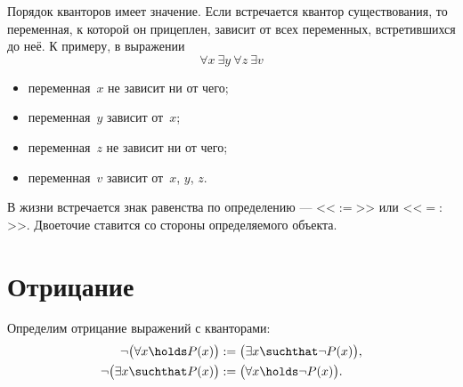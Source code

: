 \begin{note}
	Порядок кванторов имеет значение. Если встречается квантор существования, то
	переменная, к которой он прицеплен, зависит от всех переменных, встретившихся
	до неё. К примеру, в выражении
	\[
		\forall x\ 
		\exists y\ 
		\forall z\ 
		\exists v
	\]
	\begin{itemize}
		\item переменная~$x$ не зависит ни от чего;
		\item переменная~$y$ зависит от~$x$;
		\item переменная~$z$ не зависит ни от чего;
		\item переменная~$v$ зависит от~$x$, $y$, $z$.
	\end{itemize}
\end{note}

\begin{note}
	В жизни встречается знак равенства по определению --- <<$:=$>> или <<$=:$>>.
	Двоеточие ставится со стороны определяемого объекта.
\end{note}

\section{Отрицание}

\begin{definition}
	\label{def:neg_quantors_simple}
	Определим отрицание выражений с кванторами:
	\begin{align}
		\neg
		\bigl(
			\forall x
			\holds
			P(x)
		\bigr)
		&:=
		\bigl(
			\exists x
			\suchthat
			\neg
			P(x)
		\bigr)
		,
		\\
		\neg
		\bigl(
			\exists x
			\suchthat
			P(x)
		\bigr)
		&:=
		\bigl(
			\forall x
			\holds
			\neg
			P(x)
		\bigr)
		.
	\end{align}
\end{definition}
